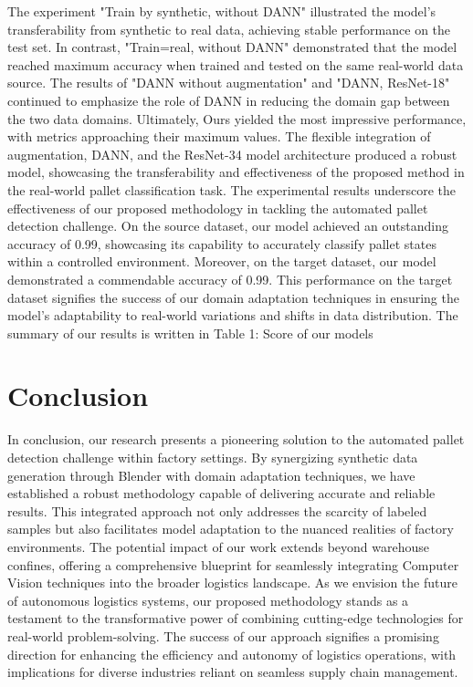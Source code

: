 \documentclass[sigconf,authordraft]{acmart}
\begin{document}
The experiment "Train by synthetic, without DANN" illustrated the model's transferability from synthetic to real data, achieving stable performance on the test set. In contrast, "Train=real, without DANN" demonstrated that the model reached maximum accuracy when trained and tested on the same real-world data source. The results of "DANN without augmentation" and "DANN, ResNet-18" continued to emphasize the role of DANN in reducing the domain gap between the two data domains. Ultimately, Ours yielded the most impressive performance, with metrics approaching their maximum values. The flexible integration of augmentation, DANN, and the ResNet-34 model architecture produced a robust model, showcasing the transferability and effectiveness of the proposed method in the real-world pallet classification task.
The experimental results underscore the effectiveness of our proposed methodology in tackling the automated pallet detection challenge. On the source dataset, our model achieved an outstanding accuracy of 0.99, showcasing its capability to accurately classify pallet states within a controlled environment.
Moreover, on the target dataset, our model demonstrated a commendable accuracy of 0.99. This performance on the target dataset signifies the success of our domain adaptation techniques in ensuring the model's adaptability to real-world variations and shifts in data distribution. The summary of our results is written in Table 1: Score of our models
\section{Conclusion}
\noindent
In conclusion, our research presents a pioneering solution to the automated pallet detection challenge within factory settings. By synergizing synthetic data generation through Blender with domain adaptation techniques, we have established a robust methodology capable of delivering accurate and reliable results. This integrated approach not only addresses the scarcity of labeled samples but also facilitates model adaptation to the nuanced realities of factory environments.
The potential impact of our work extends beyond warehouse confines, offering a comprehensive blueprint for seamlessly integrating Computer Vision techniques into the broader logistics landscape. As we envision the future of autonomous logistics systems, our proposed methodology stands as a testament to the transformative power of combining cutting-edge technologies for real-world problem-solving. The success of our approach signifies a promising direction for enhancing the efficiency and autonomy of logistics operations, with implications for diverse industries reliant on seamless supply chain management.
\end{document}
